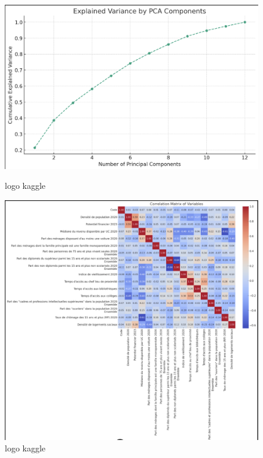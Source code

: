 \documentclass{article}
\begin{document}
\begin{figure}[h]
    \centering
    \begin{minipage}{0.48\textwidth}
        \includegraphics[width=\linewidth]{Screenshot_2024-03-04_at_18.00.52.png}
        \caption{logo kaggle}
        \label{fig:kaggle1}
    \end{minipage}\hfill
    \begin{minipage}{0.48\textwidth}
        \includegraphics[width=\linewidth]{Screenshot_2024-03-04_at_17.59.59.png}
        \caption{logo kaggle}
        \label{fig:kaggle2}
    \end{minipage}
\end{figure}
\end{document}

